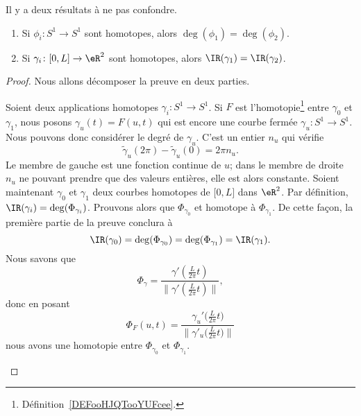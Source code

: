 \begin{proposition}      \label{PROPooZIAKooHqtnZj}
	Il y a deux résultats à ne pas confondre.
	\begin{enumerate}
		\item   \label{ITEMooLEHFooXEyTHY}
		      Si \( \phi_i\colon S^1\to S^1\) sont homotopes, alors \( \deg(\phi_1)=\deg(\phi_2)\).
		\item
		      Si \(\gamma_i\colon \mathopen[ 0 , L \mathclose]\to \eR^2 \) sont homotopes, alors \( \IR(\gamma_1)=\IR(\gamma_2)\).
	\end{enumerate}
\end{proposition}

\begin{proof}
	Nous allons décomposer la preuve en deux parties.
	\begin{subproof}
		Soient deux applications homotopes \( \gamma_i\colon S^1\to S^1\). Si \( F\) est l'homotopie\footnote{Définition~\ref{DEFooHJQTooYUFcee}.} entre \( \gamma_0\) et \( \gamma_1\), nous posons \( \gamma_u(t)=F(u,t)\) qui est encore une courbe fermée \( \gamma_u\colon S^1\to S^1\). Nous pouvons donc considérer le degré de \( \gamma_u\). C'est un entier \( n_u\) qui vérifie
		\begin{equation}
			\tilde \gamma_u(2\pi)-\tilde \gamma_u(0)=2\pi n_u.
		\end{equation}
		Le membre de gauche est une fonction continue de \( u\); dans le membre de droite \( n_u\) ne pouvant prendre que des valeurs entières, elle est alors constante.
		Soient maintenant \( \gamma_0\) et \( \gamma_1\) deux courbes homotopes de \( \mathopen[ 0 , L \mathclose]\) dans \( \eR^2\). Par définition, \( \IR(\gamma_i)=\deg(\Phi_{\gamma_i})\). Prouvons alors que \( \Phi_{\gamma_0}\) et homotope à \( \Phi_{\gamma_1}\). De cette façon, la première partie de la preuve conclura à
		\begin{equation}
			\IR(\gamma_0)=\deg(\Phi_{\gamma_0})=\deg(\Phi_{\gamma_1})=\IR(\gamma_1).
		\end{equation}
		Nous savons que
		\begin{equation}
			\Phi_{\gamma}=\frac{ \gamma'\left( \frac{ L }{ 2\pi }t \right) }{ \| \gamma'\left( \frac{ L }{ 2\pi }t \right) \| },
		\end{equation}
		donc en posant
		\begin{equation}
			\Phi_F(u,t)=\frac{ \gamma_u'\big( \frac{ L }{ 2\pi }t \big) }{ \| \gamma'_u\big( \frac{ L }{ 2\pi }t \big) \| }
		\end{equation}
		nous avons une homotopie entre \( \Phi_{\gamma_0}\) et \( \Phi_{\gamma_1}\).
	\end{subproof}
\end{proof}

